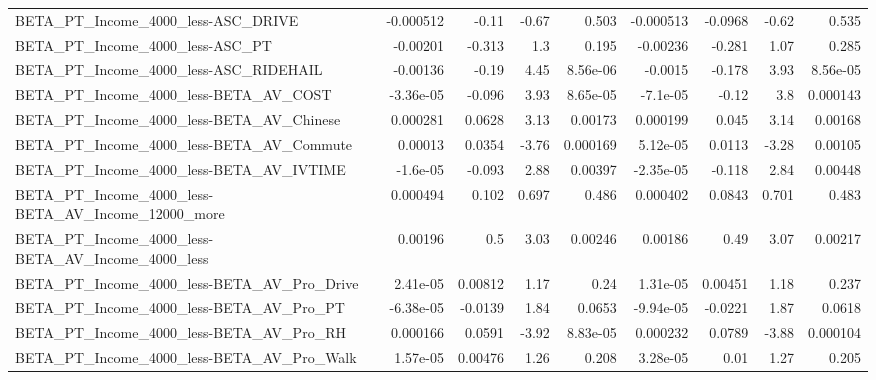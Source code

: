 \begin{tabular}{lrrrrrrrr}
BETA\_PT\_Income\_4000\_less-ASC\_DRIVE                 &   -0.000512 &        -0.11 &     -0.67 &    0.503 &  -0.000513 &     -0.0968 &        -0.62 &         0.535 \\
BETA\_PT\_Income\_4000\_less-ASC\_PT                    &    -0.00201 &       -0.313 &       1.3 &    0.195 &   -0.00236 &      -0.281 &         1.07 &         0.285 \\
BETA\_PT\_Income\_4000\_less-ASC\_RIDEHAIL              &    -0.00136 &        -0.19 &      4.45 & 8.56e-06 &    -0.0015 &      -0.178 &         3.93 &      8.56e-05 \\
BETA\_PT\_Income\_4000\_less-BETA\_AV\_COST              &   -3.36e-05 &       -0.096 &      3.93 & 8.65e-05 &   -7.1e-05 &       -0.12 &          3.8 &      0.000143 \\
BETA\_PT\_Income\_4000\_less-BETA\_AV\_Chinese           &    0.000281 &       0.0628 &      3.13 &  0.00173 &   0.000199 &       0.045 &         3.14 &       0.00168 \\
BETA\_PT\_Income\_4000\_less-BETA\_AV\_Commute           &     0.00013 &       0.0354 &     -3.76 & 0.000169 &   5.12e-05 &      0.0113 &        -3.28 &       0.00105 \\
BETA\_PT\_Income\_4000\_less-BETA\_AV\_IVTIME            &    -1.6e-05 &       -0.093 &      2.88 &  0.00397 &  -2.35e-05 &      -0.118 &         2.84 &       0.00448 \\
BETA\_PT\_Income\_4000\_less-BETA\_AV\_Income\_12000\_more &    0.000494 &        0.102 &     0.697 &    0.486 &   0.000402 &      0.0843 &        0.701 &         0.483 \\
BETA\_PT\_Income\_4000\_less-BETA\_AV\_Income\_4000\_less  &     0.00196 &          0.5 &      3.03 &  0.00246 &    0.00186 &        0.49 &         3.07 &       0.00217 \\
BETA\_PT\_Income\_4000\_less-BETA\_AV\_Pro\_Drive         &    2.41e-05 &      0.00812 &      1.17 &     0.24 &   1.31e-05 &     0.00451 &         1.18 &         0.237 \\
BETA\_PT\_Income\_4000\_less-BETA\_AV\_Pro\_PT            &   -6.38e-05 &      -0.0139 &      1.84 &   0.0653 &  -9.94e-05 &     -0.0221 &         1.87 &        0.0618 \\
BETA\_PT\_Income\_4000\_less-BETA\_AV\_Pro\_RH            &    0.000166 &       0.0591 &     -3.92 & 8.83e-05 &   0.000232 &      0.0789 &        -3.88 &      0.000104 \\
BETA\_PT\_Income\_4000\_less-BETA\_AV\_Pro\_Walk          &    1.57e-05 &      0.00476 &      1.26 &    0.208 &   3.28e-05 &        0.01 &         1.27 &         0.205 \\

\end{tabular}
